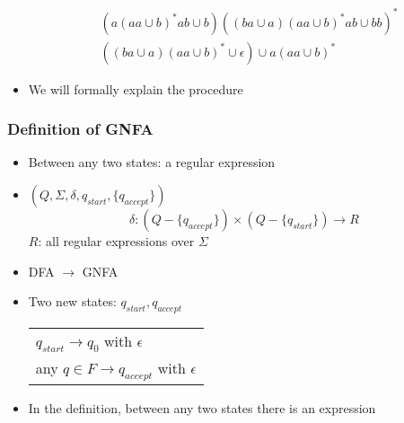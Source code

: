 \begin{frame}[allowframebreaks]
\begin{itemize}
\begin{center}
\end{center}
\begin{equation*}
  \begin{split}
& (a(aa\cup b)^* ab \cup b)
((ba \cup a)(aa \cup b)^* ab \cup bb)^*
\\
&((ba \cup a)
    (aa\cup b)^* \cup \epsilon) \cup a(aa \cup b)^*
  \end{split}
\end{equation*}
\item We will formally explain the procedure
\end{itemize}
\end{frame}

\begin{frame}[allowframebreaks] \frametitle{Definition of GNFA}
  \begin{itemize}
\item Between any two states: a regular expression
\item $(Q, \Sigma, \delta, q_{start}, \{q_{accept}\})$
  \begin{equation*}
    \delta:(Q-\{q_{accept}\})\times
(Q-\{q_{start}\})\rightarrow R
  \end{equation*}
$R$: all regular expressions over $\Sigma$



\item DFA $\rightarrow $ GNFA

\item [] Two new states: $q_{start}, q_{accept}$

  \begin{center}
    \begin{tabular}{l}
$q_{start} \rightarrow q_0$ with $\epsilon$ \\
any $q \in F \rightarrow q_{accept}$ with $\epsilon$
    \end{tabular}
\end{center}
\item In the definition, between any two states there is
  an expression


\end{itemize}
\end{frame}
